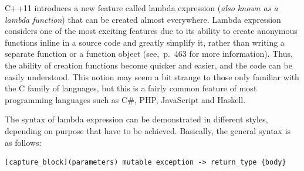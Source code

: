 \documentclass[11pt]{report}
\begin{document}
C++11 introduces a new feature called lambda expression (\emph{also known as a lambda function}) that can be created almost everywhere. Lambda expression considers one of the most exciting features due to its ability to create anonymous functions inline in a source code and greatly simplify it, rather than writing a separate function or a function object (see\cite{Gregorie:professionalcpp},~p.~463 for more information). Thus, the ability of creation functions become quicker and easier, and the code can be easily understood. This notion may seem a bit strange to those only familiar with the C family of languages, but this is a fairly common feature of most programming languages such as C\#, PHP, JavaScript and Haskell.

The syntax of lambda expression can be demonstrated in different styles, depending on purpose that have to be achieved. Basically, the general syntax is as follows:
\begin{lstlisting}
[capture_block](parameters) mutable exception -> return_type {body}
\end{lstlisting}
\end{document}
